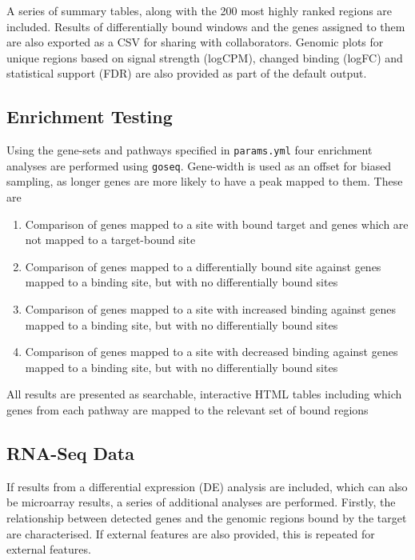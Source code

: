 \documentclass[
]{book}
\providecommand{\tightlist}{%
  \setlength{\itemsep}{0pt}\setlength{\parskip}{0pt}}
\begin{document}
A series of summary tables, along with the 200 most highly ranked regions are included.
Results of differentially bound windows and the genes assigned to them are also exported as a CSV for sharing with collaborators.
Genomic plots for unique regions based on signal strength (logCPM), changed binding (logFC) and statistical support (FDR) are also provided as part of the default output.

\hypertarget{enrichment-testing}{%
\subsection*{Enrichment Testing}\label{enrichment-testing}}

Using the gene-sets and pathways specified in \texttt{params.yml} four enrichment analyses are performed using \texttt{goseq}\citep{goseq}.
Gene-width is used as an offset for biased sampling, as longer genes are more likely to have a peak mapped to them.
These are

\begin{enumerate}
\def\labelenumi{\arabic{enumi}.}
\tightlist
\item
  Comparison of genes mapped to a site with bound target and genes which are not mapped to a target-bound site
\item
  Comparison of genes mapped to a differentially bound site against genes mapped to a binding site, but with no differentially bound sites
\item
  Comparison of genes mapped to a site with increased binding against genes mapped to a binding site, but with no differentially bound sites
\item
  Comparison of genes mapped to a site with decreased binding against genes mapped to a binding site, but with no differentially bound sites
\end{enumerate}

All results are presented as searchable, interactive HTML tables including which genes from each pathway are mapped to the relevant set of bound regions

\hypertarget{rna-seq-data}{%
\subsection*{RNA-Seq Data}\label{rna-seq-data}}

If results from a differential expression (DE) analysis are included, which can also be microarray results, a series of additional analyses are performed.
Firstly, the relationship between detected genes and the genomic regions bound by the target are characterised.
If external features are also provided, this is repeated for external features.
\end{document}
